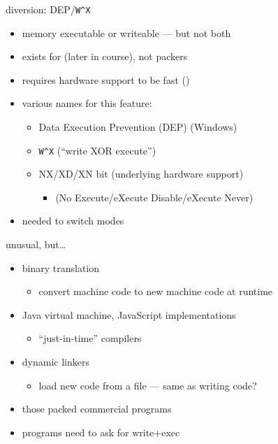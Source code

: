 \begin{frame}{diversion: DEP/{\tt W\textasciicircum X}}
    \begin{itemize}
    \item memory executable or writeable --- but not both
    \item exists for  (later in course), not packers
    \item requires hardware support to be fast ()
    \item various names for this feature:
        \begin{itemize}
        \item Data Execution Prevention (DEP) (Windows)
        \item {\tt W\textasciicircum X} (``write XOR execute'')
        \item NX/XD/XN bit  (underlying hardware support)
            \begin{itemize}
            \item (No Execute/eXecute Disable/eXecute Never)
            \end{itemize}
        \end{itemize}
    \item {} needed to switch modes 
    \end{itemize}
\end{frame}

\begin{frame}{unusual, but\ldots}
    \begin{itemize}
    \item binary translation
        \begin{itemize}
        \item convert machine code to new machine code at runtime
        \end{itemize}
    \item Java virtual machine, JavaScript implementations
        \begin{itemize}
        \item ``just-in-time'' compilers
        \end{itemize}
    \item dynamic linkers
        \begin{itemize}
        \item load new code from a file --- same as writing code?
        \end{itemize}
    \item those packed commercial programs
    \vspace{.5cm}
    \item programs need to  ask for write+exec
    \end{itemize}
\end{frame}

